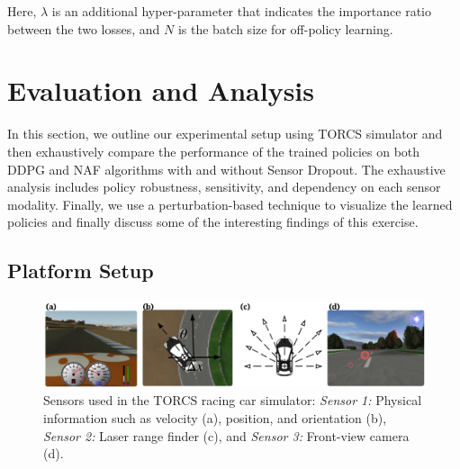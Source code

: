 \documentclass[../thesis.tex]{subfiles}
\begin{document}
Here, $\lambda$ is an additional hyper-parameter that indicates the importance ratio between the two losses, and $N$ is the batch size for off-policy learning.





\section{Evaluation and Analysis} \label{sec:mdrl-results}
In this section, we outline our experimental setup using TORCS simulator and then exhaustively compare the performance of the trained policies on both DDPG and NAF algorithms with and without Sensor Dropout. The exhaustive analysis includes policy robustness, sensitivity, and dependency on each sensor modality. Finally, we use a perturbation-based technique to visualize the learned policies and finally discuss some of the interesting findings of this exercise.

\subsection{Platform Setup} \label{sec:platform}

\begin{figure}[t]
	\centering
	\vskip 0.2in
	\includegraphics[width=\columnwidth]{./MultimodalDRL/fig/TORCS.png} %
	\caption{Sensors used in the TORCS racing car simulator: \textit{Sensor 1:} Physical information such as velocity (a), position, and orientation (b), \textit{Sensor 2:} Laser range finder (c), and \textit{Sensor 3:} Front-view camera (d).}
	\label{fig:TORCS}
\end{figure} 
\end{document}
